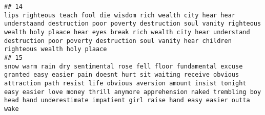 \documentclass[]{article}
\begin{document}
\begin{verbatim}
## 14                                                                                                                                                                                                                                                                                                                                                                                                                                                                                                                                                                                                                                                                                                                                                                                                                                                                                                                                  lips righteous teach fool die wisdom rich wealth city hear hear understaand destruction poor poverty destruction soul vanity righteous wealth holy plaace hear eyes break rich wealth city hear understand destruction poor poverty destruction soul vanity hear children righteous wealth holy plaace
## 15                                                                                                                                                                                                                                                                                                                                                                                                                                                                                                                                                                                                                                                                                                                                                                                                                                                                                   snow warm rain dry sentimental rose fell floor fundamental excuse granted easy easier pain doesnt hurt sit waiting receive obvious attraction path resist life obvious aversion amount insist tonight easy easier love money thrill anymore apprehension naked trembling boy head hand underestimate impatient girl raise hand easy easier outta wake

\end{verbatim}
\end{document}
